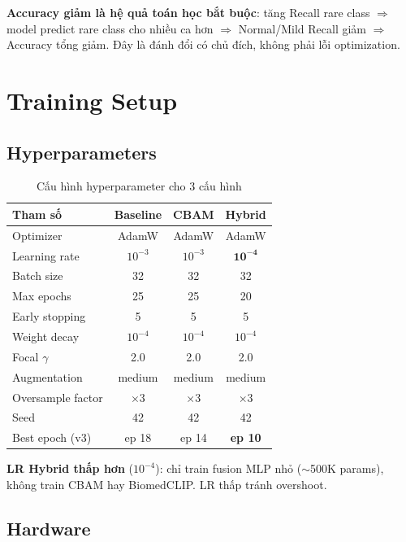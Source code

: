 \documentclass[11pt,a4paper]{article}
\newcommand{\best}[1]{\textcolor{best}{\textbf{#1}}}
\begin{document}
\noindent\textbf{Accuracy giảm là hệ quả toán học bắt buộc}: tăng Recall
rare class $\Rightarrow$ model predict rare class cho nhiều ca hơn
$\Rightarrow$ Normal/Mild Recall giảm $\Rightarrow$ Accuracy tổng giảm.
Đây là đánh đổi có chủ đích, không phải lỗi optimization.

\section{Training Setup}

\subsection{Hyperparameters}

\begin{table}[h]
\centering
\caption{Cấu hình hyperparameter cho 3 cấu hình}
\begin{tabular}{@{}lccc@{}}
\toprule
\rowcolor{tablehdr}
Tham số & Baseline & CBAM & Hybrid \\
\midrule
Optimizer            & AdamW     & AdamW     & AdamW \\
Learning rate        & $10^{-3}$ & $10^{-3}$ & $\mathbf{10^{-4}}$ \\
Batch size           & 32        & 32        & 32 \\
Max epochs           & 25        & 25        & 20 \\
Early stopping       & 5         & 5         & 5 \\
Weight decay         & $10^{-4}$ & $10^{-4}$ & $10^{-4}$ \\
Focal $\gamma$       & 2.0       & 2.0       & 2.0 \\
Augmentation         & medium    & medium    & medium \\
Oversample factor    & $\times 3$ & $\times 3$ & $\times 3$ \\
Seed                 & 42        & 42        & 42 \\
\midrule
Best epoch (v3)      & ep 18     & ep 14     & \best{ep 10} \\
\bottomrule
\end{tabular}
\end{table}

\noindent\textbf{LR Hybrid thấp hơn} ($10^{-4}$): chỉ train fusion MLP
nhỏ ($\sim$500K params), không train CBAM hay BiomedCLIP. LR thấp tránh
overshoot.

\subsection{Hardware}
\end{document}
